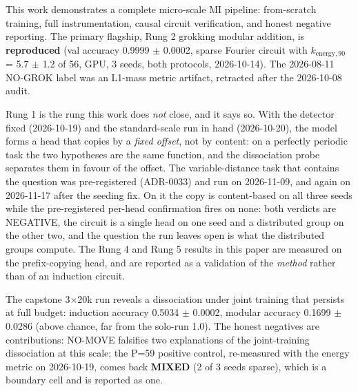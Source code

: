 \documentclass[11pt]{article}
\begin{document}
This work demonstrates a complete micro-scale MI pipeline: from-scratch
training, full instrumentation, causal circuit verification, and honest
negative reporting. The primary flagship, Rung 2 grokking modular addition,
is \textbf{reproduced} (val accuracy 0.9999 $\pm$ 0.0002, sparse Fourier
circuit with $k_{\mathrm{energy},90}$ = 5.7 $\pm$ 1.2 of 56, GPU, 3 seeds,
both protocols, 2026-10-14). The 2026-08-11 NO-GROK label was an L1-mass
metric artifact, retracted after the 2026-10-08 audit.

Rung 1 is the rung this work does \emph{not} close, and it says so. With
the detector fixed (2026-10-19) and the standard-scale run in hand
(2026-10-20), the model forms a head that copies by a \emph{fixed offset},
not by content: on a perfectly periodic task the two hypotheses are the
same function, and the dissociation probe separates them in favour of the
offset. The variable-distance task that contains the question was
pre-registered (ADR-0033) and run on 2026-11-09, and again on 2026-11-17 after the seeding fix. On it the copy is
content-based on all three seeds while the pre-registered per-head
confirmation fires on none: both verdicts are NEGATIVE, the circuit is a single head on one seed
and a distributed group on the other two, and the question the run leaves open is what the
distributed groups compute. The Rung 4 and Rung 5 results in this paper are measured on the
prefix-copying head, and are reported as a validation of the \emph{method}
rather than of an induction circuit.

The capstone 3$\times$20k run reveals a dissociation under joint training
that persists at full budget: induction accuracy 0.5034 $\pm$ 0.0002,
modular accuracy 0.1699 $\pm$ 0.0286 (above chance, far from the solo-run
1.0). The honest negatives are contributions: NO-MOVE falsifies two
explanations of the joint-training dissociation at this scale; the P=59
positive control, re-measured with the energy metric on 2026-10-19, comes
back \textbf{MIXED} (2 of 3 seeds sparse), which is a boundary cell and is
reported as one.



\end{document}
